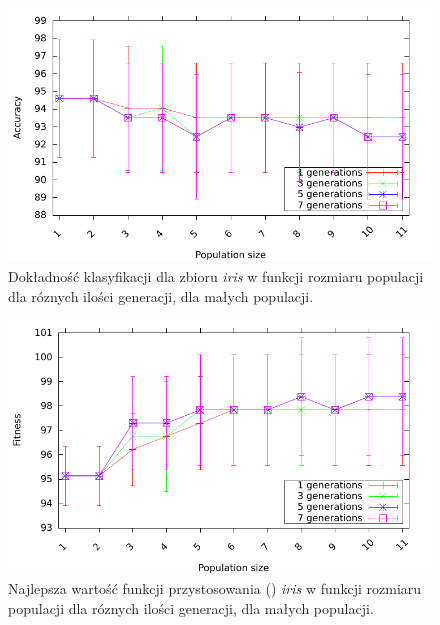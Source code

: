 \documentclass{article}
\begin{document}
	\begin{figure}[ht]
		\includegraphics[scale=0.90]{figures/accuracy-iris-detailed}
		\caption{Dokładność klasyfikacji dla zbioru \emph{iris} w funkcji rozmiaru populacji dla róznych ilości generacji, dla małych populacji.	\label{fig:acc-iris-detailed}}
	\end{figure}	
	
	
		\begin{figure}[ht]
		\includegraphics[scale=0.90]{figures/fitness-iris-detailed}
		\caption{Najlepsza wartość funkcji przystosowania ()  \emph{iris} w funkcji rozmiaru populacji dla róznych ilości generacji, dla małych populacji.	\label{fig:fit-iris-detailed}}
	\end{figure}	
	
\end{document}
